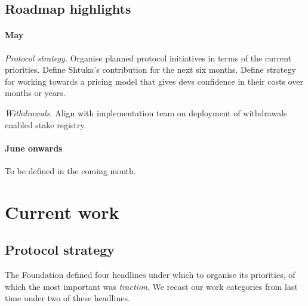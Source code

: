 \subsection*{Roadmap highlights}

\paragraph{May}
%
\emph{Protocol strategy.} 
%
Organise planned protocol initiatives in terms of the current priorities.
%
Define Shtuka's contribution for the next six months.
%
Define strategy for working towards a pricing model that gives devs confidence in their costs over months or years.

\emph{Withdrawals.} Align with implementation team on deployment of withdrawals enabled stake registry.

\paragraph{June onwards}
%
To be defined in the coming month.

\newpage
\section*{Current work}

\subsection*{Protocol strategy}
%
The Foundation defined four headlines under which to organise its priorities, of which the most important was \emph{traction}.
%
We recast our work categories from last time under two of these headlines.

